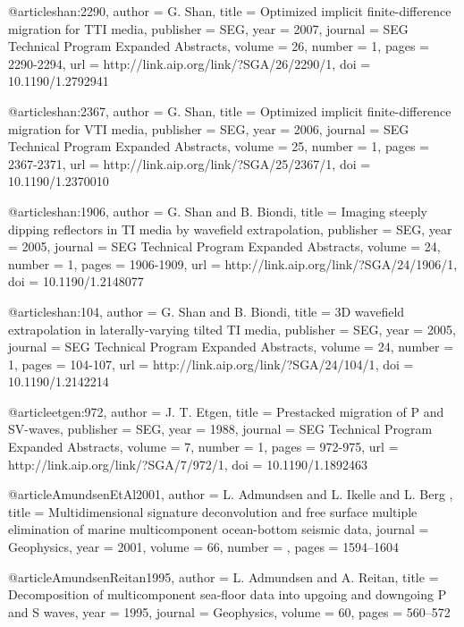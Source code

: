 {@article{shan:2290,
  author =	 {G. Shan},
  title =	 {Optimized implicit finite-difference migration for
                  {TTI} media},
  publisher =	 {SEG},
  year =	 2007,
  journal =	 {SEG Technical Program Expanded Abstracts},
  volume =	 26,
  number =	 1,
  pages =	 {2290-2294},
  url =		 {http://link.aip.org/link/?SGA/26/2290/1},
  doi =		 {10.1190/1.2792941}
}

@article{shan:2367,
  author =	 {G. Shan},
  title =	 {Optimized implicit finite-difference migration for
                  {VTI} media},
  publisher =	 {SEG},
  year =	 2006,
  journal =	 {SEG Technical Program Expanded Abstracts},
  volume =	 25,
  number =	 1,
  pages =	 {2367-2371},
  url =		 {http://link.aip.org/link/?SGA/25/2367/1},
  doi =		 {10.1190/1.2370010}
}

@article{shan:1906,
  author =	 {G. Shan and B. Biondi},
  title =	 {Imaging steeply dipping reflectors in {TI} media by
                  wavefield extrapolation},
  publisher =	 {SEG},
  year =	 2005,
  journal =	 {SEG Technical Program Expanded Abstracts},
  volume =	 24,
  number =	 1,
  pages =	 {1906-1909},
  url =		 {http://link.aip.org/link/?SGA/24/1906/1},
  doi =		 {10.1190/1.2148077}
}

@article{shan:104,
  author =	 {G. Shan and B. Biondi},
  title =	 {{3D} wavefield extrapolation in laterally-varying
                  tilted {TI} media},
  publisher =	 {SEG},
  year =	 2005,
  journal =	 {SEG Technical Program Expanded Abstracts},
  volume =	 24,
  number =	 1,
  pages =	 {104-107},
  url =		 {http://link.aip.org/link/?SGA/24/104/1},
  doi =		 {10.1190/1.2142214}
}

@article{etgen:972,
  author =	 {J. T. Etgen},
  title =	 {Prestacked migration of {P} and {S}{V}-waves},
  publisher =	 {SEG},
  year =	 1988,
  journal =	 {SEG Technical Program Expanded Abstracts},
  volume =	 7,
  number =	 1,
  pages =	 {972-975},
  url =		 {http://link.aip.org/link/?SGA/7/972/1},
  doi =		 {10.1190/1.1892463}
}

@article{AmundsenEtAl2001,
author = {L. Admundsen and L. Ikelle and L. Berg },
title = {Multidimensional signature deconvolution and free surface multiple elimination of marine multicomponent ocean-bottom seismic data},
journal = {Geophysics},
year = {2001},
volume = {66},
number = {},
pages = {1594--1604}
}

@article{AmundsenReitan1995,
  author =	 {L. Admundsen and A. Reitan},
  title =	 {Decomposition of multicomponent sea-floor data into
                  upgoing and downgoing {P} and {S} waves},
  year =	 1995,
  journal =	 {Geophysics},
  volume =	 60,
  pages =	 {560--572}
}

}
